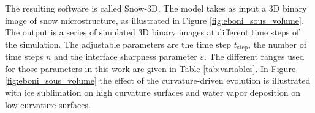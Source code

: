 \documentclass[draft,ms]{agujournal2019}
\begin{document}
%
%


The resulting software is called Snow-3D. The model takes as input a 3D binary image of snow microstructure, as illustrated in Figure \ref{fig:eboni_sous_volume}. The output is a series of simulated 3D binary images at different time steps of the simulation. The adjustable parameters are the time step $t_{\mathrm{step}}$, the number of time steps $n$ and the interface sharpness parameter $\varepsilon$. The different ranges used for those parameters in this work are given in Table \ref{tab:variables}. In Figure \ref{fig:eboni_sous_volume} the effect of the curvature-driven evolution is illustrated with ice sublimation on high curvature surfaces and water vapor deposition on low curvature surfaces.
\end{document}
